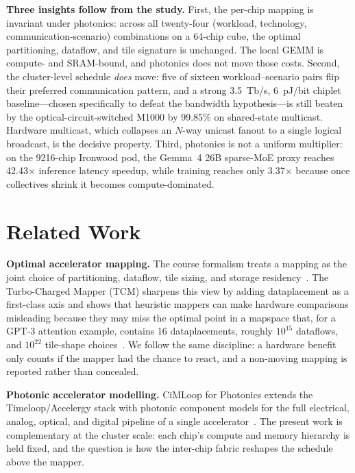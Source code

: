 \documentclass[conference]{IEEEtran}
\newcommand{\pjbit}{pJ/bit}
\newcommand{\tbps}{Tb/s}
\begin{document}
\textbf{Three insights follow from the study.}
First, the per-chip mapping is invariant under photonics: across
all twenty-four (workload, technology, communication-scenario)
combinations on a 64-chip cube, the optimal partitioning,
dataflow, and tile signature is unchanged. The local GEMM is
compute- and SRAM-bound, and photonics does not move those costs.
Second, the cluster-level schedule \emph{does} move: five of
sixteen workload--scenario pairs flip their preferred
communication pattern, and a strong 3.5~\tbps{}, 6~\pjbit{}
chiplet baseline---chosen specifically to defeat the bandwidth
hypothesis---is still beaten by the optical-circuit-switched M1000
by 99.85\% on shared-state multicast. Hardware multicast, which
collapses an $N$-way unicast fanout to a single logical broadcast,
is the decisive property. Third, photonics is not a uniform
multiplier: on the 9216-chip Ironwood pod, the Gemma~4 26B
sparse-MoE proxy reaches 42.43$\times$ inference latency speedup,
while training reaches only 3.37$\times$ because once collectives
shrink it becomes compute-dominated.

\section{Related Work}
\label{sec:related}

\textbf{Optimal accelerator mapping.}
The course formalism treats a mapping as the joint choice of
partitioning, dataflow, tile sizing, and storage
residency~\cite{lec05-mapping,lec06-partitioning}. The Turbo-Charged
Mapper (TCM) sharpens this view by adding dataplacement as a
first-class axis and shows that heuristic mappers can make
hardware comparisons misleading because they may miss the optimal
point in a mapspace that, for a GPT-3 attention example, contains
16 dataplacements, roughly $10^{15}$ dataflows, and $10^{22}$
tile-shape choices~\cite{tcm}. We follow the same discipline: a
hardware benefit only counts if the mapper had the chance to
react, and a non-moving mapping is reported rather than
concealed.

\textbf{Photonic accelerator modelling.}
CiMLoop for Photonics extends the Timeloop/Accelergy stack with
photonic component models for the full electrical, analog,
optical, and digital pipeline of a single
accelerator~\cite{ciml-photonics}. The present work is
complementary at the cluster scale: each chip's compute and memory
hierarchy is held fixed, and the question is how the inter-chip
fabric reshapes the schedule above the mapper.
\end{document}
